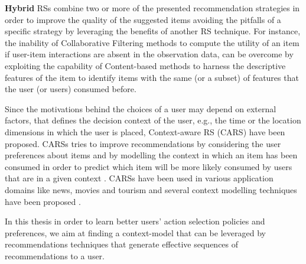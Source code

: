 \noindent\textbf{Hybrid} RSs \cite{hybrid:RSdef} combine two or more of the presented recommendation strategies in order to improve the quality of the suggested items avoiding the pitfalls of a specific strategy by leveraging the benefits of another RS technique. For instance, the inability of Collaborative Filtering methods to compute the utility of an item if user-item interactions are absent in the observation data, can be overcome by exploiting the capability of Content-based methods to harness the descriptive features of the item to identify items with the same (or a subset) of features that the user (or users) consumed before.\newline


Since the motivations behind the choices of a user may depend on external factors, that defines the decision context of the user, e.g., the time or the location dimensions in which the user is placed, Context-aware RS (CARS) have been proposed. CARSs tries to improve recommendations by considering the user preferences about items and by modelling the context in which an item has been consumed in order to predict which item will be more likely consumed by users that are in a given context \cite{adomavicius:2011}. CARSs have been used in various application domains like news, movies and tourism \cite{lommatzsch:news:2017, adomavicius:movie:2005, braunhofer:sts:2015} and several context modelling techniques have been proposed \cite{baltrunas:2012,braunhofer:2017}. \newline


In this thesis in order to learn better users' action selection policies and preferences, we aim at finding a context-model that can be leveraged by recommendations techniques that generate effective sequences of recommendations to a user.


